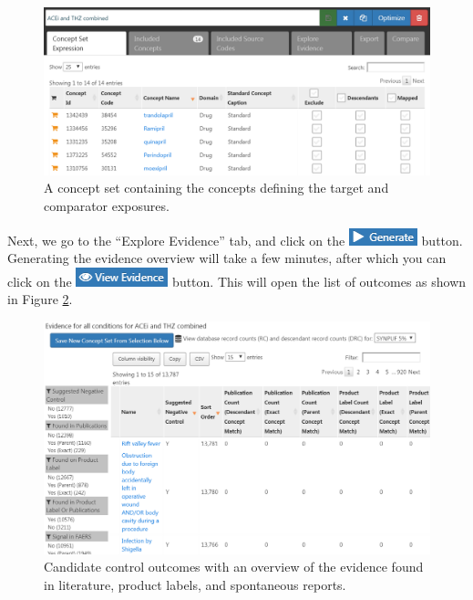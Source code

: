 \documentclass[11pt]{book}
\theoremstyle{definition}
\theoremstyle{definition}
\theoremstyle{definition}
\theoremstyle{remark}
\begin{document}
\begin{figure}

{\centering \includegraphics[width=1\linewidth]{images/MethodValidity/exposuresConceptSet} 

}

\caption{A concept set containing the concepts defining the target and comparator exposures.}\label{fig:exposuresConceptSet}
\end{figure}

Next, we go to the ``Explore Evidence'' tab, and click on the
\includegraphics{images/MethodValidity/generate.png} button. Generating
the evidence overview will take a few minutes, after which you can click
on the \includegraphics{images/MethodValidity/viewEvidence.png} button.
This will open the list of outcomes as shown in Figure
\ref{fig:candidateNcs}.

\begin{figure}

{\centering \includegraphics[width=1\linewidth]{images/MethodValidity/candidateNcs} 

}

\caption{Candidate control outcomes with an overview of the evidence found in literature, product labels, and spontaneous reports.}\label{fig:candidateNcs}
\end{figure}
\end{document}
